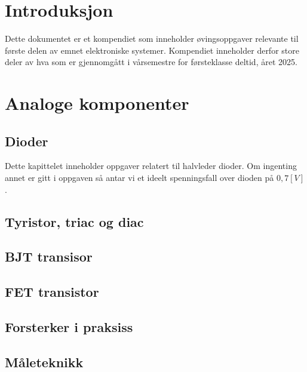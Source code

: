 \documentclass[12pt]{report}
\begin{document}


\tableofcontents
\newpage


\chapter{Introduksjon}
Dette dokumentet er et kompendiet som inneholder øvingsoppgaver relevante til første delen av emnet elektroniske systemer. Kompendiet inneholder derfor store deler av hva som er gjennomgått i vårsemestre for førsteklasse deltid, året 2025.


\chapter{Analoge komponenter}



\section{Dioder}


Dette kapittelet inneholder oppgaver relatert til halvleder dioder. Om ingenting annet er gitt i oppgaven så antar vi et ideelt spenningsfall over dioden på $0,7[V]$.\\


\printsolutions[section]



\newpage

\section{Tyristor, triac og diac}

\printsolutions[section]

\section{BJT transisor}

\section{FET transistor}

\section{Forsterker i praksiss}

\section{Måleteknikk}

\newpage

\printbibliography[heading=bibintoc, title={Referanser}]
\end{document}
